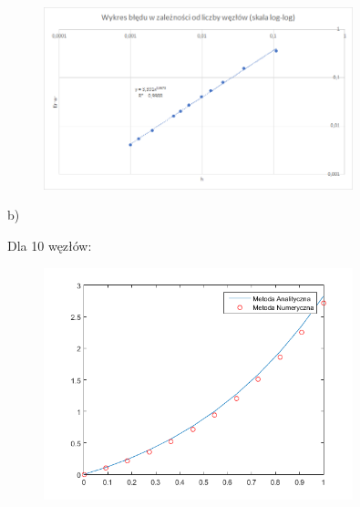 \begin{samepage}

	\FloatBarrier
	\begin{figure}[!ht]
		\begin{center}
			\includegraphics[width=0.8\textwidth]{Lab4/charts/zad4/a/error.png}
		\end{center}
	\end{figure}
	\FloatBarrier
\end{samepage}

\newpage

b)

\begin{samepage}
	Dla 10 węzłów:
	
	\FloatBarrier
	\begin{figure}[!ht]
		\begin{center}
			\includegraphics[width=0.8\textwidth]{Lab4/charts/zad4/b/10.png}
		\end{center}
	\end{figure}
	\FloatBarrier
\end{samepage}

